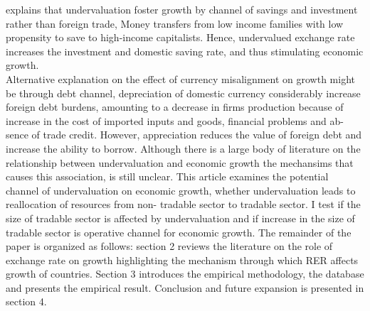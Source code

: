 \documentclass{article}
\begin{document}
explains that undervaluation foster growth by channel of savings and investment rather than foreign trade, Money transfers from low income families with low propensity to save to high-income capitalists. Hence, undervalued exchange rate increases the investment and domestic saving rate, and thus stimulating economic growth.\\
Alternative explanation on the effect of currency misalignment on growth might be through debt channel, depreciation of domestic currency considerably increase foreign debt burdens, amounting to a decrease in firms production because of increase in the cost of imported inputs and goods, financial problems and ab- sence of trade credit. However, appreciation reduces the value of foreign debt and increase the ability to borrow.
Although there is a large body of literature on the relationship between undervaluation and economic growth the mechansims that causes this association, is still unclear. This article examines the potential channel of undervaluation on economic growth, whether undervaluation leads to reallocation of resources from non- tradable sector to tradable sector. I test if the size of tradable sector is affected by undervaluation and if increase in the size of tradable sector is operative channel for economic growth.
The remainder of the paper is organized as follows: section 2 reviews the literature on the role of exchange rate on growth highlighting the mechanism through which RER affects growth of countries. Section 3 introduces the empirical methodology, the database and presents the empirical result. Conclusion and future expansion is presented in section 4.
\end{document}
